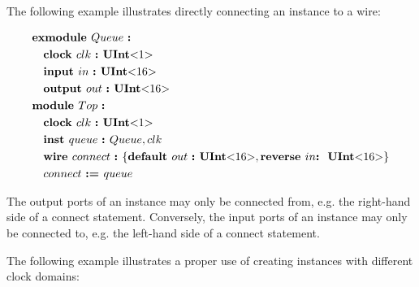 \documentclass[12pt]{article}
\begin{document}
The following example illustrates directly connecting an instance to a wire:

{\footnotesize
\[
\begin{aligned}
&\kw{exmodule} Queue \ \kws{:} \\
&\quad \kw{clock} clk  \ \kw{:} \kws{UInt$<$} 1 \kws{$>$} \\
&\quad \kw{input} in   \ \kw{:} \kws{UInt$<$}16\kws{$>$} \\
&\quad \kw{output} out \ \kw{:} \kws{UInt$<$}16\kws{$>$} \\
&\kw{module} Top \ \kws{:} \\
&\quad \kw{clock} clk \ \kw{:} \kws{UInt$<$} 1 \kws{$>$} \\
&\quad \kw{inst} queue \ \kw{:} Queue, clk \\
&\quad \kw{wire} connect \ \kw{:} \bundleT{\kw{default} out \ \kw{:} \kws{UInt$<$}16\kws{$>$},\kw{reverse} in \kw{:} \ \kws{UInt$<$}16\kws{$>$}} \\
&\quad connect \ \kw{:=} queue \\
\end{aligned}
\]
}

The output ports of an instance may only be connected from, e.g. the right-hand side of a connect statement.
Conversely, the input ports of an instance may only be connected to, e.g. the left-hand side of a connect statement.

The following example illustrates a proper use of creating instances with different clock domains:
\end{document}
